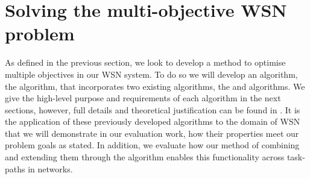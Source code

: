 \section{Solving the multi-objective WSN problem}
\label{section:solution}
As defined in the previous section, we look to develop a method to optimise multiple objectives in our WSN system. To do so we will develop an algorithm, the \acronymWSNOptimisationExtended{}{} algorithm, that incorporates two existing algorithms, the \acronymATARIAExtended{}{} and \acronymMGRAOExtended{}{} algorithms. We give the high-level purpose and requirements of each algorithm in the next sections, however, full details and theoretical justification can be found in \cite{creech2021dynamic, creech2021resource}. It is the application of these previously developed algorithms to the domain of WSN that we will demonstrate in our evaluation work, how their properties meet our problem goals as stated. In addition, we evaluate how our method of combining and extending them through the \acronymWSNOptimisation{}{} algorithm enables this functionality across task-paths in networks.

